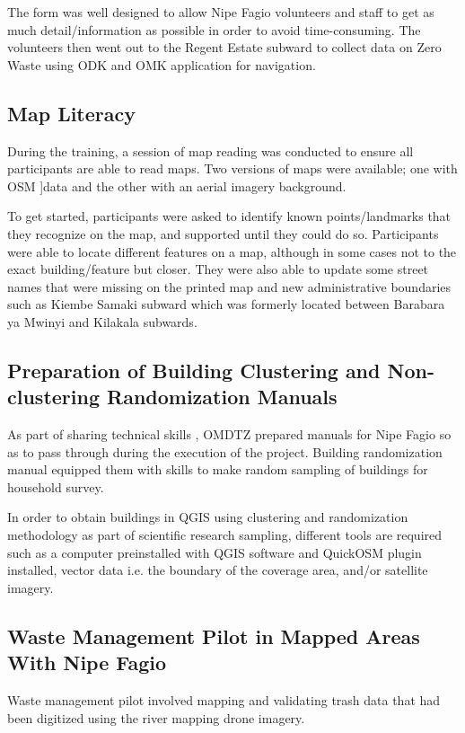 \documentclass[a4paper,12pt,twoside]{article}
\begin{document}
    The form was well designed to allow Nipe Fagio volunteers and staff to get as much detail/information as possible in order to avoid time-consuming. The volunteers then went out to the Regent Estate subward to collect  data on Zero Waste using ODK and OMK application for navigation. 

\subsection{Map Literacy}

    During the training, a session of map reading was conducted to ensure all participants are able to read  maps. Two versions of maps were available; one with OSM ]data and the other with an aerial imagery background.
    
    To get started, participants were asked to identify known points/landmarks that they recognize on the map, and supported until they could do so. Participants were able to locate different features on a map, although in some cases not to the exact building/feature but closer. They were also able to update some street names that were missing on the printed map and new administrative boundaries such as Kiembe Samaki subward which was formerly located between Barabara ya Mwinyi and Kilakala subwards. 


\subsection{Preparation of Building Clustering and Non-clustering Randomization Manuals}

    As part of sharing technical skills , OMDTZ prepared manuals for Nipe Fagio so as to pass through during the execution of the project. Building randomization manual equipped them with skills to make random sampling of buildings for household survey.
    
    In order to obtain buildings in QGIS using clustering and randomization methodology as part of scientific research sampling, different tools are required such as a computer preinstalled with QGIS software and QuickOSM plugin installed, vector data i.e. the boundary of the coverage area, and/or satellite imagery.

\subsection{Waste Management Pilot in Mapped Areas With Nipe Fagio}

    Waste management pilot involved mapping and validating trash data that had been digitized using the river mapping drone imagery.
    
\end{document}
